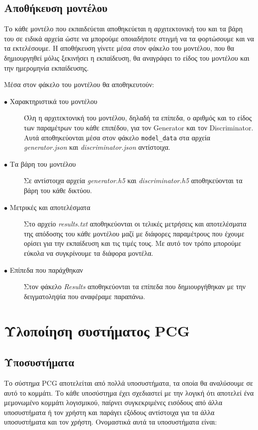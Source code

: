 \subsection{Αποθήκευση μοντέλου}
Το κάθε μοντέλο που εκπαιδεύεται αποθηκεύεται η αρχιτεκτονική του και τα βάρη του σε ειδικά αρχεία ώστε να μπορούμε οποιαδήποτε στιγμή να τα φορτώσουμε και να τα εκτελέσουμε. Η αποθήκευση γίνετε μέσα στον φάκελο του μοντέλου, που θα δημιουργηθεί μόλις ξεκινήσει η εκπαίδευση, θα αναγράφει το είδος του μοντέλου και την ημερομηνία εκπαίδευσης.
\par
Μέσα στον φάκελο του μοντέλου θα αποθηκευτούν:
\begin{description}
\item[$\bullet$ Χαρακτηριστικά του μοντέλου] Όλη η αρχιτεκτονική του μοντέλου, δηλαδή τα επίπεδα, ο αριθμός και το είδος των παραμέτρων του κάθε επιπέδου, για τον Generator και τον Discriminator. Αυτά αποθηκεύονται μέσα στον φάκελο \texttt{model\_data} στα αρχεία  \textit{generator.json} και \textit{discriminator.json} αντίστοιχα.
\item[$\bullet$ Τα βάρη του μοντέλου] Σε αντίστοιχα αρχεία \textit{generator.h5} και \textit{discriminator.h5} αποθηκεύονται τα βάρη του κάθε δικτύου.
\item[$\bullet$ Μετρικές και αποτελέσματα] Στο αρχείο \textit{results.txt} αποθηκεύονται οι τελικές μετρήσεις και αποτελέσματα της απόδοσης του κάθε μοντέλου μαζί με διάφορες παραμέτρους που έχουμε ορίσει για την εκπαίδευση και τις τιμές τους. Με αυτό τον τρόπο μπορούμε εύκολα να συγκρίνουμε τα διάφορα μοντέλα.
\item[$\bullet$ Επίπεδα που παράχθηκαν] Στον φάκελο \textit{Results} αποθηκεύονται τα επίπεδα που δημιουργήθηκαν με την δειγματοληψία που αναφέραμε παραπάνω.
\end{description}

\section{Υλοποίηση συστήματος PCG}

\subsection{Υποσυστήματα}
Το σύστημα PCG αποτελείται από πολλά υποσυστήματα, τα οποία θα αναλύσουμε σε αυτό το κομμάτι. Το κάθε υποσύστημα έχει σχεδιαστεί με την λογική ότι αποτελεί ένα μεμονωμένο κομμάτι λογισμικού, παίρνει συγκεκριμένες εισόδους από άλλα υποσυστήματα ή τον χρήστη και παράγει εξόδους αντίστοιχα για τα άλλα υποσυστήματα και τον χρήστη. Ονομαστικά αυτά τα υποσυστήματα είναι:

